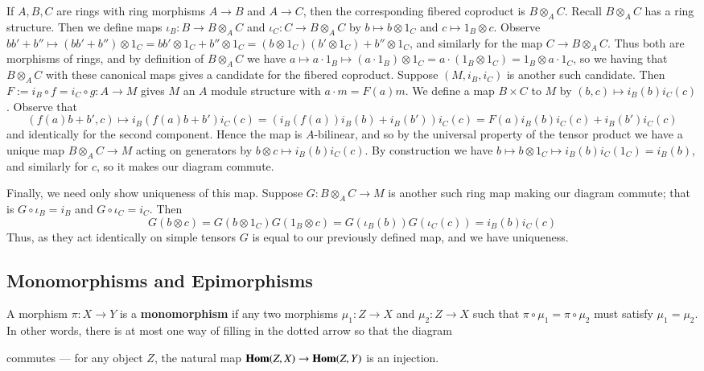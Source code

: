 \begin{example}
    If $A,B,C$ are rings with ring morphisms $A\rightarrow B$ and $A\rightarrow C$, then the corresponding fibered coproduct is $B\otimes_AC$. Recall $B\otimes_AC$ has a ring structure. Then we define maps $\iota_B:B\rightarrow B\otimes_AC$ and $\iota_C:C\rightarrow B\otimes_AC$ by $b\mapsto b\otimes 1_C$ and $c\mapsto 1_B\otimes c$. Observe $bb'+b'' \mapsto (bb'+b'')\otimes 1_C = bb'\otimes 1_C+b''\otimes 1_C = (b\otimes 1_C)(b'\otimes 1_C) + b''\otimes 1_C$, and similarly for the map $C\rightarrow B\otimes_AC$. Thus both are morphisms of rings, and by definition of $B\otimes_AC$ we have $a\mapsto a\cdot 1_B\mapsto (a\cdot 1_B)\otimes 1_C = a\cdot(1_B\otimes 1_C) = 1_B\otimes a\cdot 1_C$, so we having that $B\otimes_AC$ with these canonical maps gives a candidate for the fibered coproduct. Suppose $(M,i_B,i_C)$ is another such candidate. Then $F := i_B\circ f = i_C\circ g:A\rightarrow M$ gives $M$ an $A$ module structure with $a\cdot m = F(a)m$. We define a map $B\times C$ to $M$ by $(b,c)\mapsto i_B(b)i_C(c)$. Observe that $$(f(a)b+b',c) \mapsto i_B(f(a)b+b')i_C(c) = (i_B(f(a))i_B(b)+i_B(b'))i_C(c) = F(a)i_B(b)i_C(c) + i_B(b')i_C(c)$$
    and identically for the second component. Hence the map is $A$-bilinear, and so by the universal property of the tensor product we have a unique map $B\otimes_AC\rightarrow M$ acting on generators by $b\otimes c \mapsto i_B(b)i_C(c)$. By construction we have $b\mapsto b\otimes 1_C \mapsto i_B(b)i_C(1_C) = i_B(b)$, and similarly for $c$, so it makes our diagram commute. 

    Finally, we need only show uniqueness of this map. Suppose $G:B\otimes_AC\rightarrow M$ is another such ring map making our diagram commute; that is $G\circ \iota_B = i_B$ and $G\circ \iota_C = i_C$. Then $$G(b\otimes c) = G(b\otimes 1_C)G(1_B\otimes c) = G(\iota_B(b))G(\iota_C(c)) = i_B(b)i_C(c)$$
    Thus, as they act identically on simple tensors $G$ is equal to our previously defined map, and we have uniqueness. 
\end{example}

\subsection{Monomorphisms and Epimorphisms}

\begin{definition}
    A morphism $\pi:X\rightarrow Y$ is a \textbf{monomorphism} if any two morphisms $\mu_1:Z\rightarrow X$ and $\mu_2:Z\rightarrow X$ such that $\pi\circ \mu_1 = \pi\circ \mu_2$ must satisfy $\mu_1 = \mu_2$. In other words, there is at most one way of filling in the dotted arrow so that the diagram
    \begin{center}
    \end{center}
    commutes --- for any object $Z$, the natural map $\mathbf{Hom}(Z,X)\rightarrow \mathbf{Hom}(Z,Y)$ is an injection.
\end{definition}

